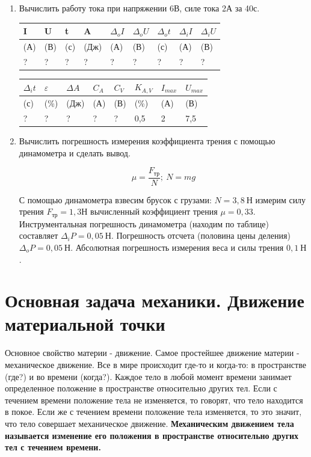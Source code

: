 \documentclass[a6paper, 11pt]{diss_4}
\renewcommand{\'}{\,'}
\begin{document}
\begin{enumerate}
\item{ Вычислить работу тока при напряжении 6В, силе тока 2А за 40с.\\

\begin{center}
\begin{tabular}[c]{l|l|l|l|l|l|l|l|l}
I & U & t & A & $\Delta_o I$ & $\Delta_o U$ & $\Delta_o t$ &
$\Delta_i I$ & $\Delta_i U$
\\ \hline
(А) & (В) & (с) & (Дж) & (А) & (В) & (с) & (А) & (В)
\\ \hline
? & ?  & ? & ? & ? & ?  & ?  & ? & ?
\end{tabular}


\begin{tabular}[c]{l|l|l|l|l|l|l|l}
$\Delta_i t$ & $\varepsilon$ & $\Delta A$
& ${C_A}$ & ${C_V}$ & ${K_{A,V}}$ & ${I_{max}}$ & ${U_{max}}$\\ \hline
(с) & (\%) & (Дж) & (А) & (В) & (\%) & (А) & (В) \\  \hline
? & ? & ? & ? & ? & 0,5 & 2 & 7,5
\end{tabular}
\end{center}
}

 \item{ Вычислить погрешность измерения коэффициента трения с помощью
динамометра и сделать вывод.

\[\mu=\frac{F_{тр}}{N}; \ N=mg\]

 С помощью динамометра взвесим брусок с грузами: $N = 3,8\ Н$ измерим силу трения
$F_{тр}=1,3 Н$ вычисленный коэффициент трения $\mu=0,33$. Инструментальная
погрешность динамометра (находим по таблице) составляет $\Delta_i P =0,05\ Н$.
Погрешность отсчета (половина цены деления) $\Delta_o P =0,05\ Н$. Абсолютная
погрешность измерения веса и силы трения $0,1\ Н$.

}
\end{enumerate}


\section{Основная задача механики. Движение материальной точки}

  Основное свойство материи - движение. Самое простейшее движение материи -
механическое движение. Все в мире происходит где-то и когда-то: в
пространстве (где?) и во времени (когда?). Каждое тело в любой момент времени
занимает определенное положение в пространстве относительно других тел. Если с
 течением времени положение тела не изменяется, то говорят, что тело находится
в покое. Если же с течением времени положение тела изменяется, то это значит,
что тело совершает механическое движение. \textbf{Механическим движением
тела называется изменение его положения в пространстве относительно других
тел с течением времени.}
\end{document}

